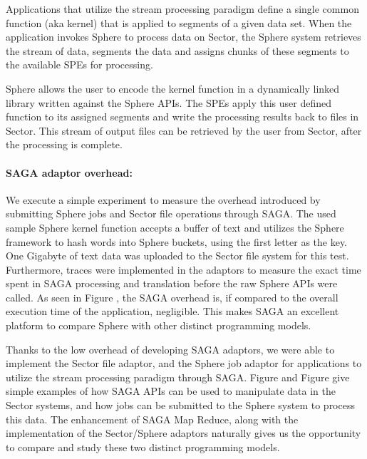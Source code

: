 \documentclass[3p,twocolumn]{elsarticle}
\begin{document}
Applications that utilize the stream processing paradigm define a
single common function (aka kernel) that is applied to segments of a
given data set.  When the application invokes Sphere to process data
on Sector, the Sphere system retrieves the stream of data, segments
the data and assigns chunks of these segments to the available SPEs
for processing.

Sphere allows the user to encode the kernel function in a dynamically
linked library written against the Sphere APIs.  The SPEs apply this
user defined function to its assigned segments and write the
processing results back to files in Sector.  This stream of output
files can be retrieved by the user from Sector, after the processing
is complete. 


\paragraph{SAGA adaptor overhead: }
\label{ssec:overhead}

We execute a simple experiment to measure the overhead introduced by
submitting Sphere jobs and Sector file operations through SAGA.  The
used sample Sphere kernel function accepts a buffer of text and
utilizes the Sphere framework to hash words into Sphere buckets, using
the first letter as the key. One Gigabyte of text data was uploaded to
the Sector file system for this test.  Furthermore, traces were
implemented in the adaptors to measure the exact time spent in SAGA
processing and translation before the raw Sphere APIs were called.  As
seen in Figure \F{}, the SAGA overhead is, if compared to the overall
execution time of the application, negligible.  This makes SAGA an
excellent platform to compare Sphere with other distinct programming
models.

Thanks to the low overhead of developing SAGA adaptors, we were able
to implement the Sector file adaptor, and the Sphere job adaptor for
applications to utilize the stream processing paradigm through SAGA.
Figure \F{} and Figure \F{} give simple examples of how SAGA APIs
can be used to manipulate data in the Sector systems, and how jobs can
be submitted to the Sphere system to process this data.  The
enhancement of SAGA Map Reduce, along with the implementation of the
Sector/Sphere adaptors naturally gives us the opportunity to compare
and study these two distinct programming models.
\end{document}
